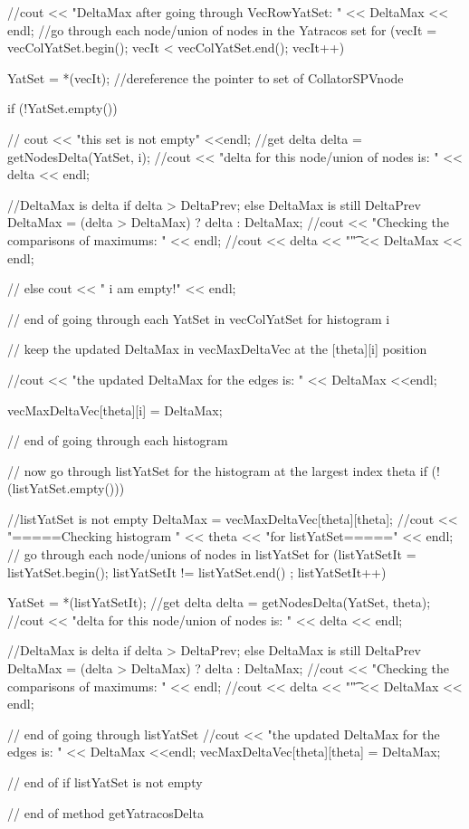 \begin{DoxyCode}
{{       //cout << "DeltaMax after going through VecRowYatSet: " << DeltaMax <<
       endl; 
      //go through each node/union of nodes in the Yatracos set
      for (vecIt = vecColYatSet.begin(); vecIt < vecColYatSet.end(); vecIt++){
        YatSet = *(vecIt); //dereference the pointer to set of CollatorSPVnode
        
        if (!YatSet.empty()) {
        //  cout << "this set is not empty" <<endl;
          //get delta
          delta = getNodesDelta(YatSet, i);
          //cout << "delta for this node/union of nodes is: " << delta << endl;
            
          //DeltaMax is delta if delta > DeltaPrev; else DeltaMax is still
       DeltaPrev
          DeltaMax = (delta > DeltaMax) ? delta : DeltaMax; 
          //cout << "Checking the comparisons of maximums: " << endl;
          //cout << delta << "\t" << DeltaMax << endl;           
        }
        
      //  else { cout << " i am empty!" << endl; }
      } // end of going through each YatSet in vecColYatSet for histogram i
      
      // keep the updated DeltaMax in vecMaxDeltaVec at the [theta][i] position
       
       //cout << "the updated DeltaMax for the edges is: " << DeltaMax <<endl; 
       
      vecMaxDeltaVec[theta][i] = DeltaMax;
  } // end of going through each histogram
      
  // now go through listYatSet for the histogram at the largest index theta
  if (!(listYatSet.empty())) { //listYatSet is not empty
       DeltaMax = vecMaxDeltaVec[theta][theta];
       //cout << "\n =====Checking histogram  " << theta << "for
       listYatSet=====" << endl;
       // go through each node/unions of nodes in listYatSet
       for (listYatSetIt = listYatSet.begin(); listYatSetIt != listYatSet.end()
      ; listYatSetIt++) {
      YatSet = *(listYatSetIt);
        //get delta
         delta = getNodesDelta(YatSet, theta);
            //cout << "delta for this node/union of nodes is: " << delta <<
       endl;
            
            //DeltaMax is delta if delta > DeltaPrev; else DeltaMax is still
       DeltaPrev
            DeltaMax = (delta > DeltaMax) ? delta : DeltaMax; 
            //cout << "Checking the comparisons of maximums: " << endl;
            //cout << delta << "\t" << DeltaMax << endl;   
    } // end of going through listYatSet
    //cout << "the updated DeltaMax for the edges is: " << DeltaMax <<endl; 
     vecMaxDeltaVec[theta][theta] = DeltaMax; 
  } // end of if listYatSet is not empty     
} // end of method getYatracosDelta
\end{DoxyCode}
